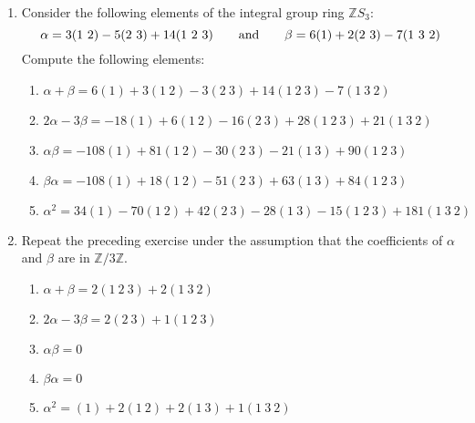 \documentclass{report}
\newcommand{\Z}{\mathbb{Z}}
\begin{document}
\begin{enumerate}
    \begin{proof}
        Suppose that $C\in Z_{M_n(R)}$. Then $C$ commutes with all elements of $M_n(R)$, so in particular, $CE_{ij}=E_{ij}C$ for all $i,j\leq n$. Therefore $c_{ij}=c_{ji}$, i.e. $C$ is symmetric. Now let $A$ be the matrix with $a_{ij}=1$ when $i\leq j$ and $0$ otherwise. Then $CA=AC$ implies that for all $i,j\leq n$
        \begin{align*}
            \sum_{k=1}^n c_{ik}a_{kj} &= \sum_{k=1}^n a_{ik}c_{kj}\\
            \sum_{k=j}^n c_{ik} &= \sum_{k=i}^j c_{kj}
        \end{align*}
        which can only happen if $c_{ij}=0$ when $i\neq j$, so $C$ is diagonal. Now for any $q,p\leq n$, $B=E_{pq}C=CE_{pq}$, so $c_{pp}=b_{pp}=c_{qq}$ and so $C$ is a scalar matrix.
    \end{proof}

    
    \setcounter{enumi}{9}
    \item Consider the following elements of the integral group ring $\Z S_3$:
    $$\alpha = 3(1\ 2) - 5(2\ 3)+14(1\ 2\ 3)\hspace{20 pt}\text{and}\hspace{20 pt} \beta=6(1) + 2(2\ 3)-7(1\ 3\ 2)$$
    Compute the following elements:
    \begin{enumerate}
        \item $\alpha + \beta = 6(1)+3(1\ 2)-3(2\ 3)+14(1\ 2\ 3)-7(1\ 3\ 2)$
        \item $2\alpha - 3\beta = -18(1)+6(1\ 2)-16(2\ 3)+28(1\ 2\ 3)+21(1\ 3\ 2)$
        \item $\alpha\beta = -108(1) + 81(1\ 2) - 30(2\ 3) - 21(1\ 3) + 90(1\ 2\ 3)$
        \item $\beta\alpha = -108(1) + 18(1\ 2) - 51(2\ 3) + 63(1\ 3) + 84(1\ 2\ 3)$
        \item  $\alpha^2 = 34(1) - 70(1\ 2) + 42 (2\ 3) - 28(1\ 3) - 15(1\ 2\ 3) + 181(1\ 3\ 2)$
    \end{enumerate}

    
    \item Repeat the preceding exercise under the assumption that the coefficients of $\alpha$ and $\beta$ are in $\Z/3\Z$.
    \begin{enumerate}
        \item $\alpha + \beta = 2(1\ 2\ 3) + 2(1\ 3\ 2)$
        \item $2\alpha - 3\beta = 2(2\ 3) + 1(1\ 2\ 3)$
        \item $\alpha\beta = 0$
        \item $\beta\alpha = 0$
        \item  $\alpha^2 = (1) + 2(1\ 2) + 2(1\ 3) + 1(1\ 3\ 2)$
    \end{enumerate}


\end{enumerate}
\end{document}
